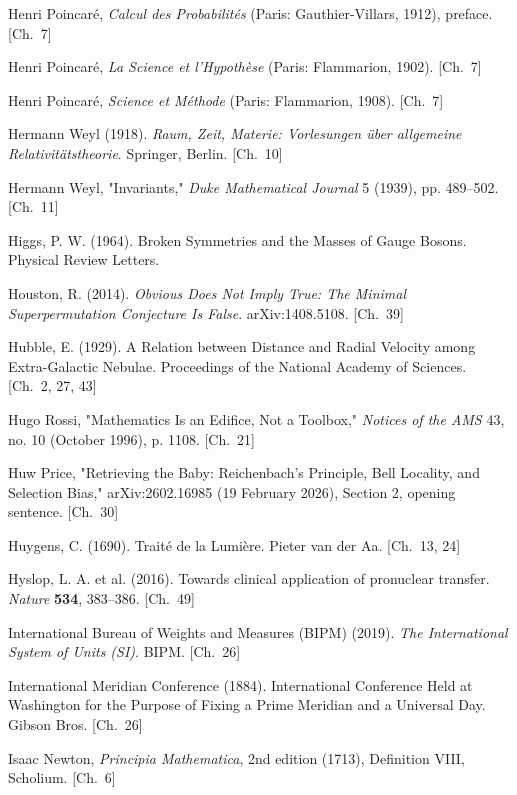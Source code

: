 \begin{list}{}{%
  \setlength{\leftmargin}{2em}%
  \setlength{\itemindent}{-2em}%
  \setlength{\itemsep}{0.35\baselineskip}%
  \setlength{\parsep}{0pt}%
  \setlength{\topsep}{0.5em}}
\item Henri Poincaré, \textit{Calcul des Probabilités} (Paris: Gauthier-Villars, 1912), preface. \hfill {\scriptsize [Ch.~7]}
\item Henri Poincaré, \textit{La Science et l'Hypothèse} (Paris: Flammarion, 1902). \hfill {\scriptsize [Ch.~7]}
\item Henri Poincaré, \textit{Science et Méthode} (Paris: Flammarion, 1908). \hfill {\scriptsize [Ch.~7]}
\item Hermann Weyl (1918). \textit{Raum, Zeit, Materie: Vorlesungen über allgemeine Relativitätstheorie}. Springer, Berlin. \hfill {\scriptsize [Ch.~10]}
\item Hermann Weyl, "Invariants," \textit{Duke Mathematical Journal} 5 (1939), pp. 489–502. \hfill {\scriptsize [Ch.~11]}
\item Higgs, P. W. (1964). Broken Symmetries and the Masses of Gauge Bosons. Physical Review Letters.
\item Houston, R. (2014). \textit{Obvious Does Not Imply True: The Minimal Superpermutation Conjecture Is False}. arXiv:1408.5108. \hfill {\scriptsize [Ch.~39]}
\item Hubble, E. (1929). A Relation between Distance and Radial Velocity among Extra-Galactic Nebulae. Proceedings of the National Academy of Sciences. \hfill {\scriptsize [Ch.~2, 27, 43]}
\item Hugo Rossi, "Mathematics Is an Edifice, Not a Toolbox," \textit{Notices of the AMS} 43, no. 10 (October 1996), p. 1108. \hfill {\scriptsize [Ch.~21]}
\item Huw Price, "Retrieving the Baby: Reichenbach's Principle, Bell Locality, and Selection Bias," arXiv:2602.16985 (19 February 2026), Section 2, opening sentence. \hfill {\scriptsize [Ch.~30]}
\item Huygens, C. (1690). Trait\'e de la Lumi\`ere. Pieter van der Aa. \hfill {\scriptsize [Ch.~13, 24]}
\item Hyslop, L. A. et al. (2016). Towards clinical application of pronuclear transfer. \textit{Nature} \textbf{534}, 383–386. \hfill {\scriptsize [Ch.~49]}
\item International Bureau of Weights and Measures (BIPM) (2019). \textit{The International System of Units (SI)}. BIPM. \hfill {\scriptsize [Ch.~26]}
\item International Meridian Conference (1884). International Conference Held at Washington for the Purpose of Fixing a Prime Meridian and a Universal Day. Gibson Bros. \hfill {\scriptsize [Ch.~26]}
\item Isaac Newton, \textit{Principia Mathematica}, 2nd edition (1713), Definition VIII, Scholium. \hfill {\scriptsize [Ch.~6]}

\end{list}
